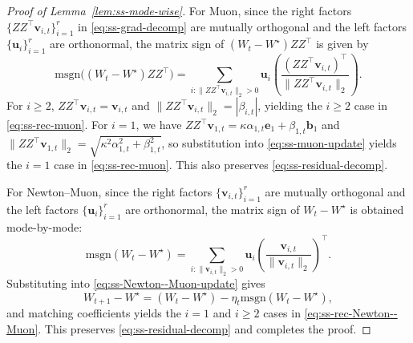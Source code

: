 \documentclass[10pt,a4paper]{amsart}
\begin{document}
\begin{proof}[Proof of Lemma~\ref{lem:ss-mode-wise}]
For Muon, since the right factors $\{ZZ^\top\boldsymbol{v}_{i,t}\}_{i=1}^r$ in \eqref{eq:ss-grad-decomp} are mutually orthogonal and the left factors $\{\boldsymbol{u}_i\}_{i=1}^r$ are orthonormal, the matrix sign of $(W_t-W^\star)ZZ^\top$ is given by
\[
\mathrm{msgn}\big((W_t-W^\star)ZZ^\top\big)
=
\sum_{i:\|ZZ^\top\boldsymbol{v}_{i,t}\|_2>0}
\boldsymbol{u}_i
\left(\frac{(ZZ^\top\boldsymbol{v}_{i,t})^\top}{\|ZZ^\top\boldsymbol{v}_{i,t}\|_2}\right).
\]
For $i\ge 2$, $ZZ^\top\boldsymbol{v}_{i,t}=\boldsymbol{v}_{i,t}$ and $\|ZZ^\top\boldsymbol{v}_{i,t}\|_2=|\beta_{i,t}|$, yielding the $i\ge 2$ case in \eqref{eq:ss-rec-muon}. For $i=1$, we have
$ZZ^\top\boldsymbol{v}_{1,t}=\kappa\alpha_{1,t}\boldsymbol{e}_1+\beta_{1,t}\boldsymbol{b}_1$ and
$\|ZZ^\top\boldsymbol{v}_{1,t}\|_2=\sqrt{\kappa^2\alpha_{1,t}^2+\beta_{1,t}^2}$, so substitution into \eqref{eq:ss-muon-update} yields the $i=1$ case in \eqref{eq:ss-rec-muon}. This also preserves \eqref{eq:ss-residual-decomp}.

For Newton--Muon, since the right factors $\{\boldsymbol{v}_{i,t}\}_{i=1}^r$ are mutually orthogonal and the left factors $\{\boldsymbol{u}_i\}_{i=1}^r$ are orthonormal, the matrix sign of $W_t-W^\star$ is obtained mode-by-mode:
\[
\mathrm{msgn}(W_t-W^\star)
=
\sum_{i:\|\boldsymbol{v}_{i,t}\|_2>0}
\boldsymbol{u}_i
\left(\frac{\boldsymbol{v}_{i,t}}{\|\boldsymbol{v}_{i,t}\|_2}\right)^\top.
\]
Substituting into \eqref{eq:ss-Newton--Muon-update} gives
\[
W_{t+1}-W^\star
=
(W_t-W^\star)-\eta_t\mathrm{msgn}(W_t-W^\star),
\]
and matching coefficients yields the $i=1$ and $i\ge 2$ cases in \eqref{eq:ss-rec-Newton--Muon}. This preserves \eqref{eq:ss-residual-decomp} and completes the proof.
\end{proof}
\end{document}
